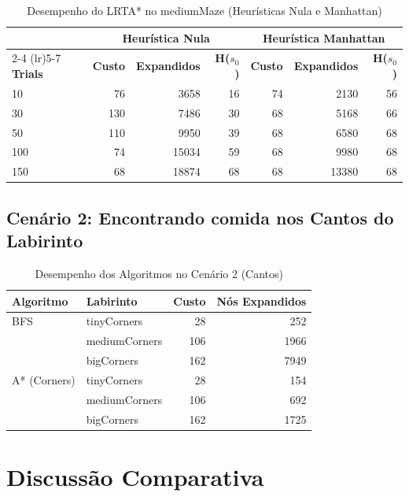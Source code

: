 \documentclass[a4paper,11pt]{article}
\begin{document}
\begin{table}[h]
\centering
\caption{Desempenho do LRTA* no mediumMaze (Heurísticas Nula e Manhattan)}
\begin{tabular}{lrrr|rrr}
\toprule
 & \multicolumn{3}{c}{\textbf{Heurística Nula}} & \multicolumn{3}{c}{\textbf{Heurística Manhattan}} \\
\cmidrule(lr){2-4} \cmidrule(lr){5-7}
\textbf{Trials} & \textbf{Custo} & \textbf{Expandidos} & \textbf{H($s_0$)} & \textbf{Custo} & \textbf{Expandidos} & \textbf{H($s_0$)} \\
\midrule
10  & 76  & 3658  & 16 & 74 & 2130  & 56 \\
30  & 130 & 7486  & 30 & 68 & 5168  & 66 \\
50  & 110 & 9950  & 39 & 68 & 6580  & 68 \\
100 & 74  & 15034 & 59 & 68 & 9980  & 68 \\
150 & 68  & 18874 & 68 & 68 & 13380 & 68 \\
\bottomrule
\end{tabular}
\end{table}

\subsection{Cenário 2: Encontrando comida nos Cantos do Labirinto}

\begin{table}[h!]
\centering
\caption{Desempenho dos Algoritmos no Cenário 2 (Cantos)}
\begin{tabular}{llrr}
\toprule
\textbf{Algoritmo} & \textbf{Labirinto} & \textbf{Custo} & \textbf{Nós Expandidos} \\
\midrule
BFS & tinyCorners & 28 & 252 \\
    & mediumCorners & 106 & 1966 \\
    & bigCorners & 162 & 7949 \\
\midrule
A* (Corners) & tinyCorners & 28 & 154 \\
             & mediumCorners & 106 & 692 \\
             & bigCorners & 162 & 1725 \\
\bottomrule
\end{tabular}
\end{table}

\section{Discussão Comparativa}
\end{document}
